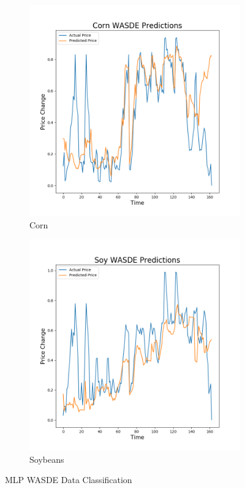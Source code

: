 \documentclass{article}
\begin{document}
\begin{figure}[H]
\centering
\begin{subfigure}{.5\textwidth}
  \centering
  \includegraphics[scale=.38]{images/CornWASDE}
\caption{Corn}
\end{subfigure}%
\begin{subfigure}{.5\textwidth}
  \centering
  \includegraphics[scale=.38]{images/SoyWASDE}
\caption{Soybeans}
\end{subfigure}
\caption{MLP WASDE Data Classification}
\end{figure}
\end{document}
